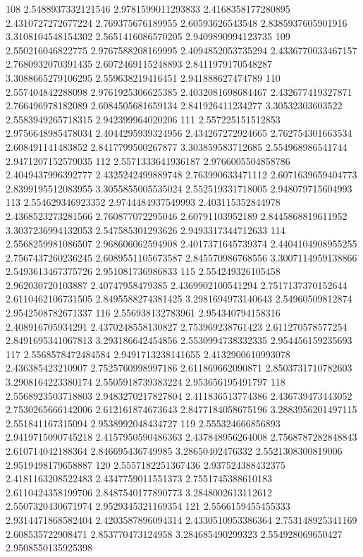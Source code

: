 108 2.5488937332121546 2.9781599011293833 2.4168358177280895 2.4310727272677224 2.769375676189955 2.60593626543548 2.8385937605901916 3.3108104548154302 2.5651416086570205 2.9409890994123735
109 2.550216046822775 2.9767588208169995 2.4094852053735294 2.4336770033467157 2.7680932070391435 2.6072469115248893 2.8411979170548287 3.3088665279106295 2.559638219416451 2.941888627474789
110 2.557404842288098 2.9761925306625385 2.4032081698684467 2.432677419327871 2.766496978182089 2.6084505681659134 2.841926411234277 3.30532303603522 2.5583949265718315 2.942399964020206
111 2.557225151512853 2.9756648985478034 2.4044295939324956 2.434267272924665 2.762754301663534 2.608491141483852 2.8417799500267877 3.303859583712685 2.554968986541744 2.9471207152579035
112 2.5571333641936187 2.9766005504858786 2.4049437996392777 2.4325242499889748 2.763990633471112 2.6071639659404773 2.8399195512083955 3.3055855005535024 2.552519331718005 2.948079715604993
113 2.554629346923352 2.9744484937549993 2.403115352844978 2.4368523273281566 2.760877072295046 2.60791103952189 2.8445868819611952 3.3037236994132053 2.547585301293626 2.9493317344712633
114 2.5568259981086507 2.968606062594908 2.4017371645739374 2.4404104908955255 2.7567437260236245 2.6089551105673587 2.845570986768556 3.3007114959138866 2.5493613467375726 2.951081736986833
115 2.554249326105458 2.962030720103887 2.40747958479385 2.4369902100541294 2.7517137370152644 2.6110462106731505 2.8495588274381425 3.2981694973140643 2.54960509812874 2.9542508782671337
116 2.556938132783961 2.954340794158316 2.408916705934291 2.4370248558130827 2.753969238761423 2.611270578577254 2.8491695341067813 3.293186642454856 2.5530994738332335 2.954456159235693
117 2.5568578472484584 2.9491713238141655 2.4132900610993078 2.436385423210907 2.7525760998997186 2.611869662090871 2.8503731710782603 3.2908164223380174 2.5505918739383224 2.953656195491797
118 2.5568923503718803 2.9483270217827804 2.411836513774386 2.436739473443052 2.7530265666142006 2.612161874673643 2.8477184058675196 3.2883956201497115 2.551841167315094 2.9538992048434727
119 2.555324666856893 2.9419715090745218 2.4157950590486363 2.437848956264008 2.7568787282848843 2.610714042188364 2.846695436749985 3.28650402476332 2.5521308300819006 2.9519498179658887
120 2.5557182251367436 2.937524388432375 2.4181163208522483 2.4347759011551373 2.7551745388610183 2.6110424358199706 2.8487540177890773 3.2848002613112612 2.5507320430671974 2.9529345321169354
121 2.5566159455455333 2.9314471868582404 2.4203587896094314 2.4330510953386364 2.753148925341169 2.608535722908471 2.853770473124958 3.284685490299323 2.554928069650427 2.9508550135925398
